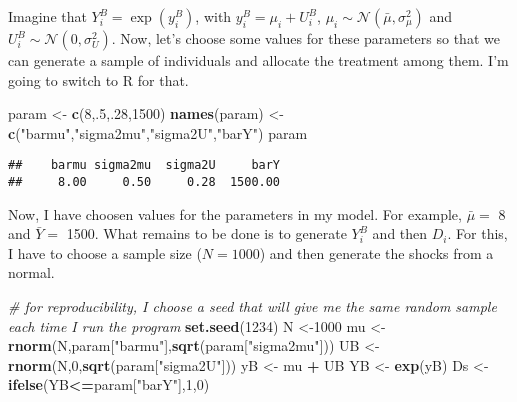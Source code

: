 \documentclass[]{book}
\newenvironment{Shaded}{\begin{snugshade}}{\end{snugshade}}
\newcommand{\KeywordTok}[1]{\textcolor[rgb]{0.13,0.29,0.53}{\textbf{#1}}}
\newcommand{\DecValTok}[1]{\textcolor[rgb]{0.00,0.00,0.81}{#1}}
\newcommand{\StringTok}[1]{\textcolor[rgb]{0.31,0.60,0.02}{#1}}
\newcommand{\CommentTok}[1]{\textcolor[rgb]{0.56,0.35,0.01}{\textit{#1}}}
\newcommand{\OperatorTok}[1]{\textcolor[rgb]{0.81,0.36,0.00}{\textbf{#1}}}
\newcommand{\NormalTok}[1]{#1}
\theoremstyle{definition}
\theoremstyle{definition}
\theoremstyle{definition}
\theoremstyle{remark}
\let\BeginKnitrBlock\begin \let\EndKnitrBlock\end
\begin{document}
\BeginKnitrBlock{example}[Sharp cutoff rule]
\protect\hypertarget{exm:unnamed-chunk-1}{}{\label{exm:unnamed-chunk-1}
\iffalse (Sharp cutoff rule) \fi{} }Imagine that \(Y_i^B=\exp(y_i^B)\),
with \(y_i^B=\mu_i+U_i^B\),
\(\mu_i\sim\mathcal{N}(\bar{\mu},\sigma^2_{\mu})\) and
\(U_i^B\sim\mathcal{N}(0,\sigma^2_{U})\). Now, let's choose some values
for these parameters so that we can generate a sample of individuals and
allocate the treatment among them. I'm going to switch to R for that.
\EndKnitrBlock{example}

\begin{Shaded}
\begin{Highlighting}[]
\NormalTok{param <-}\StringTok{ }\KeywordTok{c}\NormalTok{(}\DecValTok{8}\NormalTok{,.}\DecValTok{5}\NormalTok{,.}\DecValTok{28}\NormalTok{,}\DecValTok{1500}\NormalTok{)}
\KeywordTok{names}\NormalTok{(param) <-}\StringTok{ }\KeywordTok{c}\NormalTok{(}\StringTok{"barmu"}\NormalTok{,}\StringTok{"sigma2mu"}\NormalTok{,}\StringTok{"sigma2U"}\NormalTok{,}\StringTok{"barY"}\NormalTok{)}
\NormalTok{param}
\end{Highlighting}
\end{Shaded}

\begin{verbatim}
##    barmu sigma2mu  sigma2U     barY 
##     8.00     0.50     0.28  1500.00
\end{verbatim}

Now, I have choosen values for the parameters in my model. For example,
\(\bar{\mu}=\) 8 and \(\bar{Y}=\) 1500. What remains to be done is to
generate \(Y_i^B\) and then \(D_i\). For this, I have to choose a sample
size (\(N=1000\)) and then generate the shocks from a normal.

\begin{Shaded}
\begin{Highlighting}[]
\CommentTok{# for reproducibility, I choose a seed that will give me the same random sample each time I run the program}
\KeywordTok{set.seed}\NormalTok{(}\DecValTok{1234}\NormalTok{)}
\NormalTok{N <-}\DecValTok{1000}
\NormalTok{mu <-}\StringTok{ }\KeywordTok{rnorm}\NormalTok{(N,param[}\StringTok{"barmu"}\NormalTok{],}\KeywordTok{sqrt}\NormalTok{(param[}\StringTok{"sigma2mu"}\NormalTok{]))}
\NormalTok{UB <-}\StringTok{ }\KeywordTok{rnorm}\NormalTok{(N,}\DecValTok{0}\NormalTok{,}\KeywordTok{sqrt}\NormalTok{(param[}\StringTok{"sigma2U"}\NormalTok{]))}
\NormalTok{yB <-}\StringTok{ }\NormalTok{mu }\OperatorTok{+}\StringTok{ }\NormalTok{UB }
\NormalTok{YB <-}\StringTok{ }\KeywordTok{exp}\NormalTok{(yB)}
\NormalTok{Ds <-}\StringTok{ }\KeywordTok{ifelse}\NormalTok{(YB}\OperatorTok{<=}\NormalTok{param[}\StringTok{"barY"}\NormalTok{],}\DecValTok{1}\NormalTok{,}\DecValTok{0}\NormalTok{) }
\end{Highlighting}
\end{Shaded}
\end{document}
